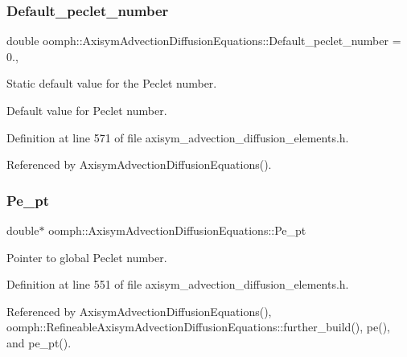 \subsubsection{\texorpdfstring{Default\+\_\+peclet\+\_\+number}{Default\_peclet\_number}}
{\footnotesize\ttfamily double oomph\+::\+Axisym\+Advection\+Diffusion\+Equations\+::\+Default\+\_\+peclet\+\_\+number = 0.\hspace{0.3cm}{\ttfamily [static]}, {\ttfamily [private]}}



Static default value for the Peclet number. 

Default value for Peclet number. 

Definition at line 571 of file axisym\+\_\+advection\+\_\+diffusion\+\_\+elements.\+h.



Referenced by Axisym\+Advection\+Diffusion\+Equations().

\mbox{\label{classoomph_1_1AxisymAdvectionDiffusionEquations_af1bc964a4a10482e926d7f241218413b}} 
\subsubsection{\texorpdfstring{Pe\+\_\+pt}{Pe\_pt}}
{\footnotesize\ttfamily double$\ast$ oomph\+::\+Axisym\+Advection\+Diffusion\+Equations\+::\+Pe\+\_\+pt\hspace{0.3cm}{\ttfamily [protected]}}



Pointer to global Peclet number. 



Definition at line 551 of file axisym\+\_\+advection\+\_\+diffusion\+\_\+elements.\+h.



Referenced by Axisym\+Advection\+Diffusion\+Equations(), oomph\+::\+Refineable\+Axisym\+Advection\+Diffusion\+Equations\+::further\+\_\+build(), pe(), and pe\+\_\+pt().

\mbox{\label{classoomph_1_1AxisymAdvectionDiffusionEquations_a1b2246dfb6f3a23bf84a90c1b483b0ba}} 
